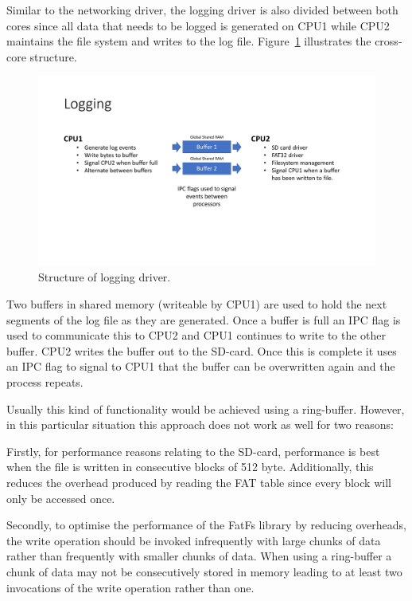 Similar to the networking driver, the logging driver is also divided between both cores since all data that needs to be logged is generated on CPU1 while CPU2 maintains the file system and writes to the log file. Figure~\ref{fig:logging_structure} illustrates the cross-core structure.

\begin{figure}[H]
    \centering \includegraphics[width=1.0\textwidth]{./figures/logging_structure.pdf}
    \caption{Structure of logging driver.}
    \label{fig:logging_structure}
\end{figure}

Two buffers in shared memory (writeable by CPU1) are used to hold the next segments of the log file as they are generated. Once a buffer is full an IPC flag is used to communicate this to CPU2 and CPU1 continues to write to the other buffer. CPU2 writes the buffer out to the SD-card. Once this is complete it uses an IPC flag to signal to CPU1 that the buffer can be overwritten again and the process repeats.

Usually this kind of functionality would be achieved using a ring-buffer. However, in this particular situation this approach does not work as well for two reasons:

Firstly, for performance reasons relating to the SD-card, performance is best when the file is written in consecutive blocks of 512 byte. Additionally, this reduces the overhead produced by reading the FAT table since every block will only be accessed once.

Secondly, to optimise the performance of the FatFs library by reducing overheads, the write operation should be invoked infrequently with large chunks of data rather than frequently with smaller chunks of data. When using a ring-buffer a chunk of data may not be consecutively stored in memory leading to at least two invocations of the write operation rather than one.

